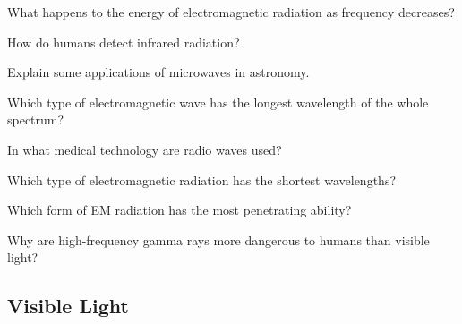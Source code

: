 \documentclass[../main-physics-problems.tex]{subfiles}
\begin{document}
\begin{questions}
\question
What happens to the energy of electromagnetic radiation as frequency decreases?


\question
How do humans detect infrared radiation?


\question
Explain some applications of microwaves in astronomy. 


\question
Which type of electromagnetic wave has the longest wavelength of the whole spectrum?


\question
In what medical technology are radio waves used?

\question
Which type of electromagnetic radiation has the shortest wavelengths?


\question
Which form of EM radiation has the most penetrating ability?


\question
Why are high-frequency gamma rays more dangerous to humans than visible light?
\end{questions}


\subsection{Visible Light}
\end{document}

